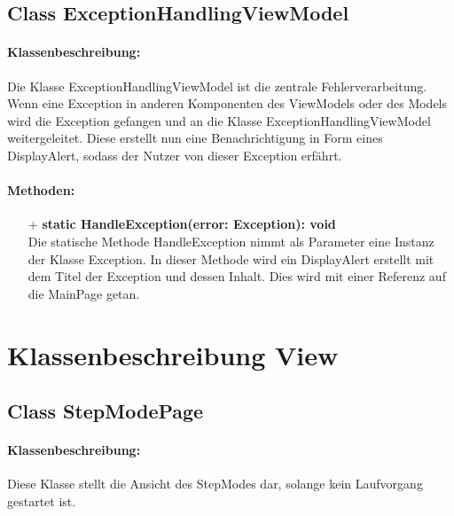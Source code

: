 \documentclass[a4paper,12pt]{article}
\begin{document}
\subsection{Class ExceptionHandlingViewModel}
	\paragraph{Klassenbeschreibung:}
	Die Klasse ExceptionHandlingViewModel ist die zentrale Fehlerverarbeitung. Wenn eine Exception in anderen Komponenten des ViewModels oder des Models wird die Exception gefangen und an die Klasse ExceptionHandlingViewModel weitergeleitet. Diese erstellt nun eine Benachrichtigung in Form eines DisplayAlert, sodass der Nutzer von dieser Exception erfährt. 
	
	\paragraph{Methoden:}
	\begin{itemize}
		\item[+] \textbf{static HandleException(error: Exception): void}\\Die statische Methode HandleException nimmt als Parameter eine Instanz der Klasse Exception. In dieser Methode wird ein DisplayAlert erstellt mit dem Titel der Exception und dessen Inhalt. Dies wird mit einer Referenz auf die MainPage getan.
	\end{itemize}
\section{Klassenbeschreibung View}


\subsection{Class StepModePage}
\paragraph{Klassenbeschreibung:}
Diese Klasse stellt die Ansicht des StepModes dar, solange kein Laufvorgang gestartet ist.
\end{document}
